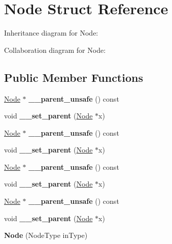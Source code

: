 \hypertarget{struct_node}{}\section{Node Struct Reference}
\label{struct_node}


Inheritance diagram for Node\+:


Collaboration diagram for Node\+:
\subsection*{Public Member Functions}
\begin{DoxyCompactItemize}
\item 
\mbox{\label{struct_node_a00ee272a7425b9d66169fd86aeb55376}} 
\mbox{\hyperlink{struct_node}{Node}} $\ast$ {\bfseries \+\_\+\+\_\+parent\+\_\+unsafe} () const
\item 
\mbox{\label{struct_node_a2d8bebf5c099eaa48b972e1403333e1e}} 
void {\bfseries \+\_\+\+\_\+set\+\_\+parent} (\mbox{\hyperlink{struct_node}{Node}} $\ast$x)
\item 
\mbox{\label{struct_node_a00ee272a7425b9d66169fd86aeb55376}} 
\mbox{\hyperlink{struct_node}{Node}} $\ast$ {\bfseries \+\_\+\+\_\+parent\+\_\+unsafe} () const
\item 
\mbox{\label{struct_node_a2d8bebf5c099eaa48b972e1403333e1e}} 
void {\bfseries \+\_\+\+\_\+set\+\_\+parent} (\mbox{\hyperlink{struct_node}{Node}} $\ast$x)
\item 
\mbox{\label{struct_node_a00ee272a7425b9d66169fd86aeb55376}} 
\mbox{\hyperlink{struct_node}{Node}} $\ast$ {\bfseries \+\_\+\+\_\+parent\+\_\+unsafe} () const
\item 
\mbox{\label{struct_node_a2d8bebf5c099eaa48b972e1403333e1e}} 
void {\bfseries \+\_\+\+\_\+set\+\_\+parent} (\mbox{\hyperlink{struct_node}{Node}} $\ast$x)
\item 
\mbox{\label{struct_node_a00ee272a7425b9d66169fd86aeb55376}} 
\mbox{\hyperlink{struct_node}{Node}} $\ast$ {\bfseries \+\_\+\+\_\+parent\+\_\+unsafe} () const
\item 
\mbox{\label{struct_node_a2d8bebf5c099eaa48b972e1403333e1e}} 
void {\bfseries \+\_\+\+\_\+set\+\_\+parent} (\mbox{\hyperlink{struct_node}{Node}} $\ast$x)
\item 
\mbox{\label{struct_node_a1926a7bf0247e8c70851c95d279fef23}} 
{\bfseries Node} (Node\+Type in\+Type)
\end{DoxyCompactItemize}
